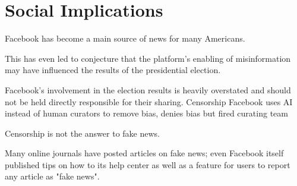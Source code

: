 
\section{Social Implications}


Facebook has become a main source of news for many Americans. 

This has even led to conjecture that the platform's enabling of misinformation may have influenced the results of the presidential election. \cite{bbc_facebook_fake_news_crisis, wp_russian_election_propaganda} 

Facebook's involvement in the election results is heavily overstated and should not be held directly responsible for their sharing. \cite{stanford_fake_news_study}
Censorship
Facebook uses AI instead of human curators to remove bias, denies bias but fired curating team \cite{tc_facebook_ai}


Censorship is not the answer to fake news. \cite{eff_cali_bill_distrastrous}

Many online journals have posted articles on fake news; \cite{tc_what_is_fake_news,telegraph_fake_news,npr_fake_news} even Facebook itself published tips on how to its help center \cite{fb_spot_fake_news} as well as a feature for users to report any article as "fake news". \cite{tc_fb_down_ranks_fake_news}